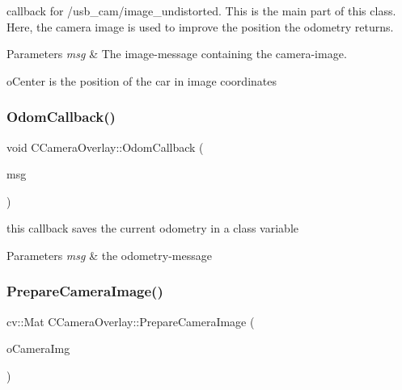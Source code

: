 callback for /usb\+\_\+cam/image\+\_\+undistorted. This is the main part of this class. Here, the camera image is used to improve the position the odometry returns. 
\begin{DoxyParams}{Parameters}
{\em msg} & The image-\/message containing the camera-\/image. \\
\hline
\end{DoxyParams}
o\+Center is the position of the car in image coordinates \mbox{\label{classCCameraOverlay_afacf6244e298a21c4f66cce388a1bba5}} 
\subsubsection{\texorpdfstring{Odom\+Callback()}{OdomCallback()}}
{\footnotesize\ttfamily void C\+Camera\+Overlay\+::\+Odom\+Callback (\begin{DoxyParamCaption}\item[{const nav\+\_\+msgs\+::\+Odometry\+Const\+Ptr \&}]{msg }\end{DoxyParamCaption})\hspace{0.3cm}{\ttfamily [inline]}}

this callback saves the current odometry in a class variable 
\begin{DoxyParams}{Parameters}
{\em msg} & the odometry-\/message \\
\hline
\end{DoxyParams}
\mbox{\label{classCCameraOverlay_a487dec7bb2107637a0a5a98b343de7ff}} 
\subsubsection{\texorpdfstring{Prepare\+Camera\+Image()}{PrepareCameraImage()}}
{\footnotesize\ttfamily cv\+::\+Mat C\+Camera\+Overlay\+::\+Prepare\+Camera\+Image (\begin{DoxyParamCaption}\item[{cv\+::\+Mat}]{o\+Camera\+Img }\end{DoxyParamCaption})\hspace{0.3cm}{\ttfamily [inline]}}

